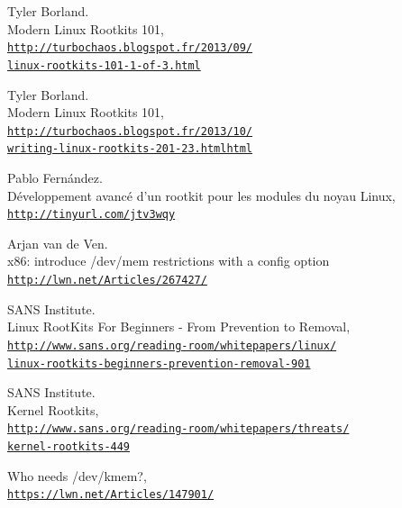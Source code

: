\documentclass[12pt]{article}
\begin{document}

\begin{thebibliography}{9}

Tyler Borland.\\
Modern Linux Rootkits 101,
\\\href{http://turbochaos.blogspot.fr/2013/09/linux-rootkits-101-1-of-3.html}{\texttt{http://turbochaos.blogspot.fr/2013/09/\\linux-rootkits-101-1-of-3.html}}

Tyler Borland.\\
Modern Linux Rootkits 101,
\\\href{http://turbochaos.blogspot.fr/2013/10/writing-linux-rootkits-201-23.html}{\texttt{http://turbochaos.blogspot.fr/2013/10/
\\writing-linux-rootkits-201-23.htmlhtml}}

Pablo Fernández.\\
Développement avancé d'un rootkit pour les modules du noyau Linux,
\\\href{http://tinyurl.com/jtv3wqy}{\texttt{http://tinyurl.com/jtv3wqy}}

Arjan van de Ven. \\
x86: introduce /dev/mem restrictions with a config option
\\\href{http://lwn.net/Articles/267427/}{\texttt{http://lwn.net/Articles/267427/}}

SANS Institute.\\
Linux RootKits For Beginners - From Prevention to Removal,
\\\href{http://www.sans.org/reading-room/whitepapers/linux/linux-rootkits-beginners-prevention-removal-901}{\texttt{http://www.sans.org/reading-room/whitepapers/linux/
\\linux-rootkits-beginners-prevention-removal-901}}

SANS Institute.\\
Kernel Rootkits,
\\\href{http://www.sans.org/reading-room/whitepapers/threats/kernel-rootkits-449}{\texttt{http://www.sans.org/reading-room/whitepapers/threats/
\\kernel-rootkits-449}}

Who needs /dev/kmem?,
\\\href{https://lwn.net/Articles/147901/}{\texttt{https://lwn.net/Articles/147901/}}


\end{thebibliography}
\end{document}
